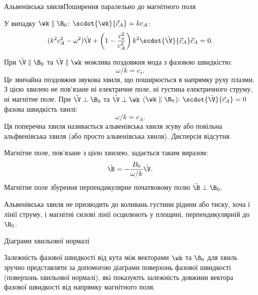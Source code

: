 \documentclass[]{beamer}
\begin{document}
\begin{frame}{Альвенівська хвиля}{Поширення паралельно до магнітного поля}
	\begin{block}{}\justifying
		У випадку $\wk\parallel \B_0$: \(\scdot{\wk}{\vec{c}_A} = kc_A \):
		\begin{equation*}
			(k^2c_A^2 - \omega^2)\tilde{\V} + \left( 1 - \frac{c_s^2}{c_A^2}\right) k^2\scdot{\tilde{\V}}{\vec{c}_A}\vec{c}_A = 0.
		\end{equation*}
		\begin{overprint}
			При $\tilde{\V} \parallel \B_0$ та $\tilde{\V} \parallel \wk$ можлива поздовжня мода з фазовою швидкістю:
			\begin{equation*}
				\omega/k = c_s.
			\end{equation*}
			Це звичайна поздовжня звукова хвиля, що поширюється в напрямку руху плазми. З цією хвилею не пов'язане ні електричне поле, ні густина електричного струму, ні магнітне поле.
			\onslide<2>
			При $\tilde{\V} \perp \B_0$ та $\tilde{\V} \perp \wk $ ($\wk \parallel \B_0$): $\scdot{\tilde{\V}}{\vec{c}_A} = 0$ фазова швидкість хвилі:
			\begin{equation*}
				\omega/k = c_A.
			\end{equation*}
			Ця поперечна хвиля називається \alert{альвенівська хвиля зсуву} або \alert{повільна альфвенівська хвиля} (або просто \alert{альвенівська} хвиля).  Дисперсія відсутня.


			Магнітне поле, пов'язане з цією хвилею, задається таким виразом:
			\begin{equation*}
				\tilde{\B} = -\frac{B_0}{\omega / k}\tilde{\V}.
			\end{equation*}
			Магнітне поле збурення перпендикулярне початвовому полю $\tilde{\B} \perp \B_0$.

			Альвенівська хвиля не призводить до коливань густини рідини або тиску, хоча і лінії струму, і магнітні силові лінії осцилюють у площині, перпендикулярній до $\B_0$.

		\end{overprint}
	\end{block}
\end{frame}

\begin{frame}{Діаграми хвильової нормалі}{}
       \begin{block}{}\justifying
    Залежність фазової швидкості від кута між векторами $\wk$ та $\B_0$ для хвиль зручно представляти за допомогою діаграми поверхонь фазової швидкості (поверхонь хвильової нормалі), які показують залежність довжини вектора фазової швидкості від напрямку магнітного поля.
\end{block}
\begin{center}

\end{center}
\end{frame}
\end{document}
